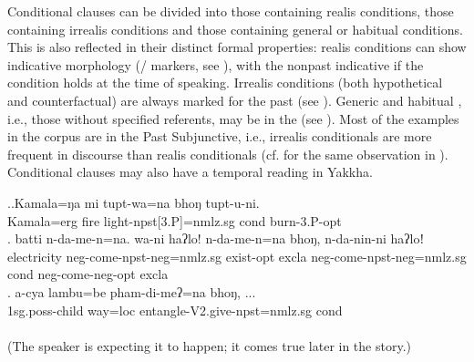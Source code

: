 \largerpage%
Conditional clauses can be divided into those containing realis conditions, those containing irrealis conditions and those containing general or habitual conditions. This is also reflected in their  distinct formal properties: realis conditions can show indicative morphology (/ markers, see \Next), with the nonpast indicative if the condition holds at the time of speaking. Irrealis conditions (both hypothetical and counterfactual) are always marked for the past (see \NNext). Generic and habitual , i.e., those without specified referents, may be in the  (see \NNext[c]). Most of the examples in the  corpus are in the Past Subjunctive, i.e., irrealis conditionals are more frequent in discourse than realis conditionals (cf. \citet[463]{Genetti2007_Newari} for the same observation in ). Conditional clauses may also have a temporal reading in Yakkha. 
\largerpage


	\ex.\ag.Kamala=ŋa mi tupt-wa=na bhoŋ tupt-u-ni.\\
	Kamala{\sc =erg} fire   light{\sc -npst[3.P]=nmlz.sg} {\sc cond} burn{\sc -3.P-opt}\\
	\bg.	batti n-da-me-n=na. wa-ni haʔlo! n-da-me-n=na bhoŋ, n-da-nin-ni haʔloǃ\\
	electricity   {\sc neg-}come{\sc [3sg]-npst-neg=nmlz.sg} exist{\sc [sbjv]-opt} {\sc excla} {\sc neg-}come{\sc [3sg]-npst-neg=nmlz.sg} {\sc cond} {\sc neg-}come{\sc [3sg]-neg-opt} {\sc excla} \\
\bg. a-cya            lambu=be    pham-di-meʔ=na bhoŋ, ...\\
{\sc 1sg.poss-}child way{\sc =loc} entangle{\sc -V2.give-npst=nmlz.sg} {\sc cond}\\
  \\
(The speaker is expecting it to happen; it comes true later in the story.)

